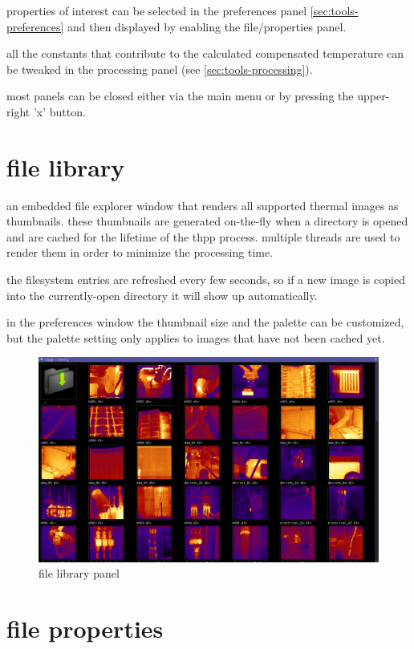 \documentclass[12pt,twoside,a4paper,titlepage]{report}
\begin{document}
properties of interest can be selected in the preferences panel \ref{sec:tools-preferences} and then displayed by enabling the file/properties panel.

all the constants that contribute to the calculated compensated temperature can be tweaked in the processing panel (see \ref{sec:tools-processing}).

most panels can be closed either via the main menu or by pressing the upper-right 'x' button.

\newpage

\section{file library} \label{sec:file-library}

an embedded file explorer window that renders all supported thermal images as thumbnails. these thumbnails are generated on-the-fly when a directory is opened and are cached for the lifetime of the thpp process. multiple threads are used to render them in order to minimize the processing time.

the filesystem entries are refreshed every few seconds, so if a new image is copied into the currently-open directory it will show up automatically. 

in the preferences window the thumbnail size and the palette can be customized, but the palette setting only applies to images that have not been cached yet.

\begin{figure}[ht]
 \centering
 \includegraphics[width=14cm, keepaspectratio=true width=10cm]{img/file_library}
 \caption{file library panel}
 \label{fig:file-library-overview}
\end{figure}

\section{file properties} \label{sec:file-properties}
\end{document}

